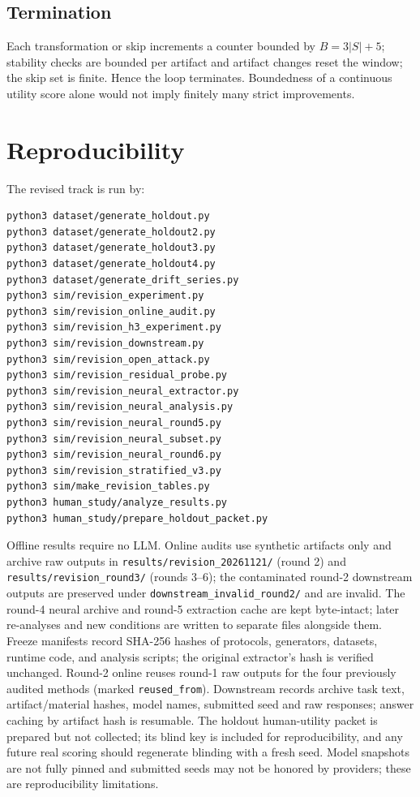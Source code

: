 \documentclass[journal]{IEEEtran}
\begin{document}
\subsection{Termination}
Each transformation or skip increments a counter bounded by $B=3|S|+5$; stability checks are bounded per artifact and artifact changes reset the window; the skip set is finite. Hence the loop terminates. Boundedness of a continuous utility score alone would not imply finitely many strict improvements.

\section{Reproducibility}\label{app:repro}
The revised track is run by:
{\scriptsize
\begin{verbatim}
python3 dataset/generate_holdout.py
python3 dataset/generate_holdout2.py
python3 dataset/generate_holdout3.py
python3 dataset/generate_holdout4.py
python3 dataset/generate_drift_series.py
python3 sim/revision_experiment.py
python3 sim/revision_online_audit.py
python3 sim/revision_h3_experiment.py
python3 sim/revision_downstream.py
python3 sim/revision_open_attack.py
python3 sim/revision_residual_probe.py
python3 sim/revision_neural_extractor.py
python3 sim/revision_neural_analysis.py
python3 sim/revision_neural_round5.py
python3 sim/revision_neural_subset.py
python3 sim/revision_neural_round6.py
python3 sim/revision_stratified_v3.py
python3 sim/make_revision_tables.py
python3 human_study/analyze_results.py
python3 human_study/prepare_holdout_packet.py
\end{verbatim}
}
Offline results require no LLM. Online audits use synthetic artifacts only and archive raw outputs in \texttt{results/revision\_20261121/} (round 2) and \texttt{results/revision\_round3/} (rounds 3--6); the contaminated round-2 downstream outputs are preserved under \texttt{downstream\_invalid\_round2/} and are invalid. The round-4 neural archive and round-5 extraction cache are kept byte-intact; later re-analyses and new conditions are written to separate files alongside them. Freeze manifests record SHA-256 hashes of protocols, generators, datasets, runtime code, and analysis scripts; the original extractor's hash is verified unchanged. Round-2 online reuses round-1 raw outputs for the four previously audited methods (marked \texttt{reused\_from}). Downstream records archive task text, artifact/material hashes, model names, submitted seed and raw responses; answer caching by artifact hash is resumable. The holdout human-utility packet is prepared but not collected; its blind key is included for reproducibility, and any future real scoring should regenerate blinding with a fresh seed. Model snapshots are not fully pinned and submitted seeds may not be honored by providers; these are reproducibility limitations.
\end{document}
